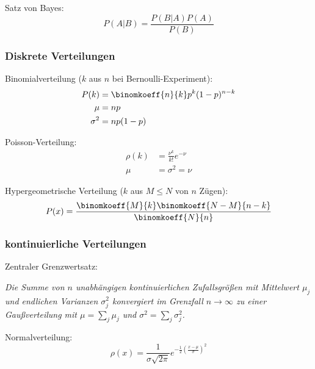 \documentclass[11pt]{article}
\numberwithin{equation}{section}
\begin{document}
				\noindent
				Satz von Bayes:
				\begin{equation}
					P(A|B) = \frac{P(B|A)P(A)}{P(B)}
				\end{equation}

			\subsubsection{Diskrete Verteilungen}
				\noindent
				Binomialverteilung ($k$ aus $n$ bei Bernoulli-Experiment):
				\begin{equation}
					\begin{aligned}
						P(k)&=\binomkoeff{n}{k}p^k(1-p)^{n-k} \\
						\mu &= np \\
						\sigma^2 &= np(1-p)
					\end{aligned}
				\end{equation}

				\noindent
				Poisson-Verteilung:
				\begin{equation}
					\begin{aligned}
						\rho(k) &= \frac{\nu^k}{k!} e^{-\nu} \\
						\mu &= \sigma^2 = \nu
					\end{aligned}
				\end{equation}

				\noindent
				Hypergeometrische Verteilung ($k$ aus $M\le N$ von $n$ Zügen):
				\begin{equation}
					P(x)=\frac{\binomkoeff{M}{k}\binomkoeff{N-M}{n-k}}{\binomkoeff{N}{n}}
				\end{equation}

			\subsubsection{kontinuierliche Verteilungen}
				\noindent
				Zentraler Grenzwertsatz: \par
					\emph{Die Summe von $n$ unabhängigen kontinuierlichen Zufallsgrößen mit Mittelwert $\mu_j$ und endlichen Varianzen $\sigma_j^2$ konvergiert im Grenzfall $n\rightarrow \infty$ zu einer Gaußverteilung mit $\mu = \sum_j \mu_j$ und $\sigma^2 = \sum_j \sigma_j^2$.} \vsp

				\noindent
				Normalverteilung:
				\begin{equation}
					\rho(x)=\frac{1}{\sigma\sqrt{2\pi}}e^{-\frac{1}{2}\left(\frac{x-\mu}{\sigma}\right)^2}
				\end{equation}
\end{document}
